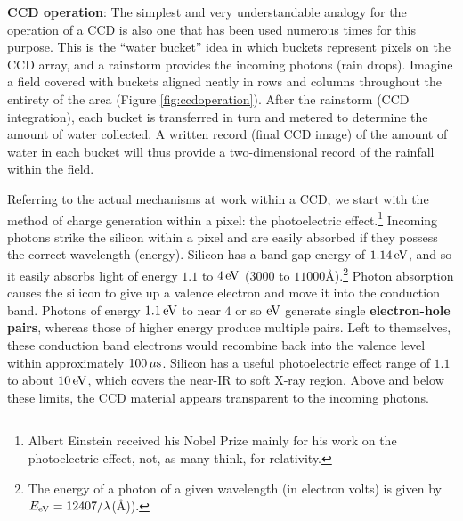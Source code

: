 \documentclass[a4paper,10pt]{article}
\begin{document}
{\noindent}\textbf{CCD operation}: The simplest and very understandable analogy for the operation of a CCD is also one that has been used numerous times for this purpose. This is the ``water bucket'' idea in which buckets represent pixels on the CCD array, and a rainstorm provides the incoming photons (rain drops). Imagine a field covered with buckets aligned neatly in rows and columns throughout the entirety of the area (Figure \ref{fig:ccdoperation}). After the rainstorm (CCD integration), each bucket is transferred in turn and metered to determine the amount of water collected. A written record (final CCD image) of the amount of water in each bucket will thus provide a two-dimensional record of the rainfall within the field.

{\noindent}Referring to the actual mechanisms at work within a CCD, we start with the method of charge generation within a pixel: the photoelectric effect.\footnote{Albert Einstein received his Nobel Prize mainly for his work on the photoelectric effect, not, as many think, for relativity.} Incoming photons strike the silicon within a pixel and are easily absorbed if they possess the correct wavelength (energy). Silicon has a band gap energy of $1.14\,{\rm eV}$, and so it easily absorbs light of energy $1.1$ to $4\,{\rm eV}$ ($3000$ to $11000$\AA).\footnote{The energy of a photon of a given wavelength (in electron volts) is given by $E_{\rm eV}=12407/\lambda$(\AA)).} Photon absorption causes the silicon to give up a valence electron and move it into the conduction band. Photons of energy $1.1\,{\rm eV}$ to near $4$ or so ${\rm eV}$ generate single \textbf{electron-hole pairs}, whereas those of higher energy produce multiple pairs. Left to themselves, these conduction band electrons would recombine back into the valence level within approximately $100\,\mu{\rm s}$. Silicon has a useful photoelectric effect range of $1.1$ to about $10\,{\rm eV}$, which covers the near-IR to soft X-ray region. Above and below these limits, the CCD material appears transparent to the incoming photons.
\end{document}

